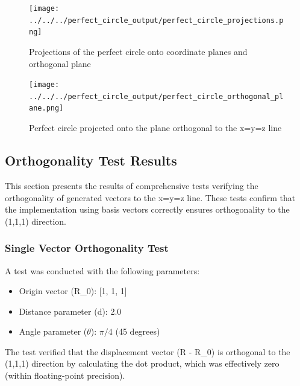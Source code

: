 \begin{figure}[H]
    \centering
    \texttt{[image: ../../../perfect\_circle\_output/perfect\_circle\_projections.png]}
    \caption{Projections of the perfect circle onto coordinate planes and orthogonal plane}
    \label{fig:perfect_circle_projections}
\end{figure}

\begin{figure}[H]
    \centering
    \texttt{[image: ../../../perfect\_circle\_output/perfect\_circle\_orthogonal\_plane.png]}
    \caption{Perfect circle projected onto the plane orthogonal to the x=y=z line}
    \label{fig:perfect_circle_orthogonal}
\end{figure}

\subsection{Orthogonality Test Results}

This section presents the results of comprehensive tests verifying the orthogonality of generated vectors to the x=y=z line. These tests confirm that the implementation using basis vectors correctly ensures orthogonality to the (1,1,1) direction.

\subsubsection{Single Vector Orthogonality Test}

A test was conducted with the following parameters:
\begin{itemize}
    \item Origin vector (R\_0): [1, 1, 1]
    \item Distance parameter (d): 2.0
    \item Angle parameter ($\theta$): $\pi/4$ (45 degrees)
\end{itemize}

The test verified that the displacement vector (R - R\_0) is orthogonal to the (1,1,1) direction by calculating the dot product, which was effectively zero (within floating-point precision).


